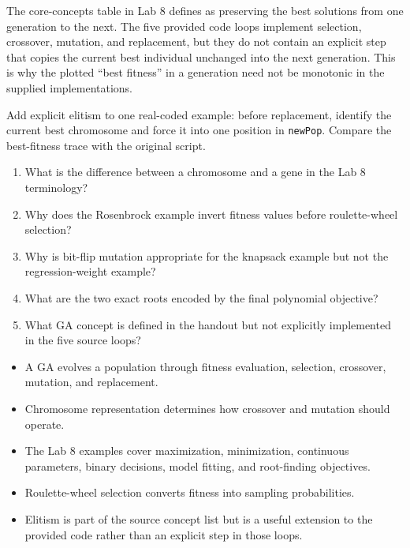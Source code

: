 The core-concepts table in Lab 8 defines  as preserving the best solutions from one generation to the next. The five provided code loops implement selection, crossover, mutation, and replacement, but they do not contain an explicit step that copies the current best individual unchanged into the next generation. This is why the plotted ``best fitness'' in a generation need not be monotonic in the supplied implementations.

\begin{debugtask}
Add explicit elitism to one real-coded example: before replacement, identify the current best chromosome and force it into one position in \texttt{newPop}. Compare the best-fitness trace with the original script.
\end{debugtask}



\clearpage
\begin{quickcheck}
\begin{enumerate}
  \item What is the difference between a chromosome and a gene in the Lab 8 terminology?
  \item Why does the Rosenbrock example invert fitness values before roulette-wheel selection?
  \item Why is bit-flip mutation appropriate for the knapsack example but not the regression-weight example?
  \item What are the two exact roots encoded by the final polynomial objective?
  \item What GA concept is defined in the handout but not explicitly implemented in the five source loops?
\end{enumerate}
\end{quickcheck}

\begin{chapterrecap}
\begin{itemize}
  \item A GA evolves a population through fitness evaluation, selection, crossover, mutation, and replacement.
  \item Chromosome representation determines how crossover and mutation should operate.
  \item The Lab 8 examples cover maximization, minimization, continuous parameters, binary decisions, model fitting, and root-finding objectives.
  \item Roulette-wheel selection converts fitness into sampling probabilities.
  \item Elitism is part of the source concept list but is a useful extension to the provided code rather than an explicit step in those loops.
\end{itemize}
\end{chapterrecap}
